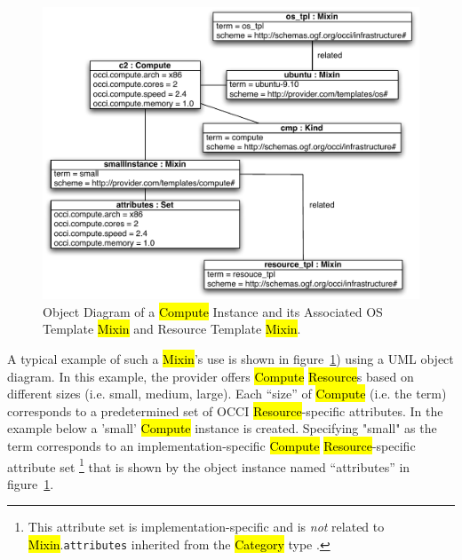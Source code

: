 \documentclass[10pt,a4paper]{article}
\begin{document}
\begin{figure}[!h]
	\centering
	\includegraphics[scale=0.5]{figs/infra_template_obj_diag2}
	\caption{Object Diagram of a \hl{Compute} Instance and its Associated OS Template 
	\hl{Mixin} and Resource Template \hl{Mixin}.}
	\label{fig:infra_template_obj_diag2}
\end{figure}

A typical example of such a \hl{Mixin}'s use is shown in
figure~\ref{fig:infra_template_obj_diag2}) using a UML object diagram. 
%
In this example, the provider offers \hl{Compute} \hl{Resource}s based on different sizes (i.e. small,
medium, large). Each ``size'' of \hl{Compute} (i.e. the term) corresponds to a predetermined set of OCCI 
\hl{Resource}-specific attributes. In the example below a 'small' \hl{Compute} instance is created. 
Specifying "small" as the term corresponds to an implementation-specific \hl{Compute} 
\hl{Resource}-specific attribute set%
\footnote{This attribute set is implementation-specific and is {\em not} related to
\hl{Mixin}.{\tt attributes} inherited from the \hl{Category} type \cite{occi:core}.}
that is shown by the object instance named ``attributes'' in
figure~\ref{fig:infra_template_obj_diag2}.
\end{document}
